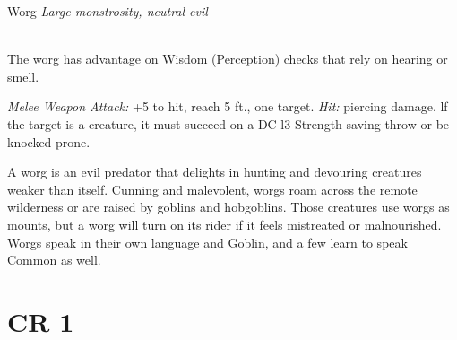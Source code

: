 \documentclass[10pt,twoside,twocolumn,openany]{book}
\begin{document}
\newpage
\begin{monsterboxnobg}{Worg}
	\textit{Large monstrosity, neutral evil}\\
	\hline
	\basics[
		armorclass	= 12 (natural armor),
		hitpoints 		= \dice{4d10 + 4},
		speed		= {50 ft.}
	]
	\hline
	\stats[
		STR	= \stat{16}, 
		DEX	= \stat{13},
		CON	= \stat{13},
		INT	= \stat{7},
		WIS	= \stat{11},
		CHA	= \stat{8}
	]
	\hline
	\details[
	skills			= {Perception +4},
	senses		= {darkvision 60 ft., passive Perception 14},
	languages		= {Goblin, Worg},
	challenge		= 1/2
	]
	\hline \\[1mm]
	\begin{monsteraction}
		The worg has advantage on Wisdom (Perception) checks that rely on hearing or smell.
	\end{monsteraction}
	\begin{monsteraction}[Bite]
		\textit{Melee Weapon Attack:} +5 to hit, reach 5 ft., one target. \textit{Hit:}  piercing damage. lf the target is a creature, it must succeed on a DC l3 Strength saving throw or be knocked prone.
	\end{monsteraction}
	
	A worg is an evil predator that delights in hunting and devouring creatures weaker than itself. Cunning and malevolent, worgs roam across the remote wilderness or are raised by goblins and hobgoblins. Those creatures use worgs as mounts, but a worg will turn on its rider if it feels mistreated or malnourished. Worgs speak in their own language and Goblin, and a few learn to speak Common as well.
\end{monsterboxnobg}
\clearpage
\section{CR 1}
\end{document}
